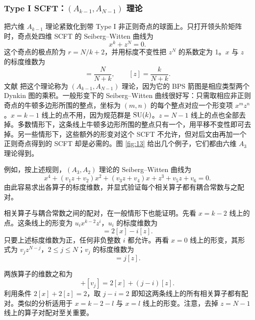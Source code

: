 \subsubsection{Type I SCFT：$(A_{k-1},A_{N-1})$ 理论}
\label{sec:6.1.1}

把六维 $A_{k-1}$ 理论紧致化到带 Type I 非正则奇点的球面上。只打开领头阶矩阵时，奇点处四维 SCFT 的 Seiberg--Witten 曲线为
\begin{equation}
x^k+z^N = 0 .
\label{eq:6.12}\tag{6.12}
\end{equation}
这个奇点的极点阶为 $r=N/k+2$，并用标度不变性把 $z^N$ 的系数定为 1。$x$ 与 $z$ 的标度维数为
\begin{equation}
[x] = \frac{N}{N+k},\qquad [z] = \frac{k}{N+k} .
\label{eq:6.13}\tag{6.13}
\end{equation}
文献 \cite{17} 把这个理论称为 $(A_{k-1},A_{N-1})$ 理论，因为它的 BPS 箭图是相应类型两个 Dynkin 图的乘积。一般形变下的 Seiberg--Witten 曲线很好写：只需取相应非正则奇点的牛顿多边形所围的整点，坐标为 $(m,n)$ 的每个整点对应一个形变项 $x^mz^n$。$x=k-1$ 线上的点不用，因为规范群是 $\operatorname{SU}(k)$。$z=N-1$ 线上的点也全部去掉。多数情形下，这条线上牛顿多边形所围的整点只有一个，用平移不变性即可去掉。另一些情形下，这些额外的形变对这个 SCFT 不允许，但对后文由再加一个正则奇点得到的 SCFT 却是必需的。图 \ref{fig:13} 给出几个例子，它们都由六维 $A_3$ 理论得到。

例如，按上述规则，$(A_3,A_2)$ 理论的 Seiberg--Witten 曲线为
\begin{equation}
x^4+(v_1z+v_2)x^2+(v_3z+v_4)x+z^3+v_5z+v_6 = 0 .
\label{eq:6.14}\tag{6.14}
\end{equation}
由此容易求出各算子的标度维数，并显式验证每个相关算子都有耦合常数与之配对。

相关算子与耦合常数之间的配对，在一般情形下也能证明。先看 $x=k-2$ 线上的点。这条线上的形变为 $u_ix^{k-2}z^i$，$u_i$ 的标度维数为
\begin{equation}
[u_i] = 2[x]-i[z] .
\label{eq:6.15}\tag{6.15}
\end{equation}
只要上述标度维数为正，任何非负整数 $i$ 都允许。再看 $x=0$ 线上的形变，其形式为 $v_jz^{N-j}$，$2\le j\le N$；$v_j$ 的标度维数为
\begin{equation}
[v_j] = j[z] .
\label{eq:6.16}\tag{6.16}
\end{equation}

两族算子的维数之和为
\begin{equation}
[u_i]+[v_j] = 2[x]+(j-i)[z] .
\label{eq:6.17}\tag{6.17}
\end{equation}
利用条件 $2[x]+2[z]=2$，取 $j-i=2$ 即知这两条线上的所有相关算子都有配对。类似的分析适用于 $x=k-2-l$ 与 $x=l$ 线上的形变。注意，去掉 $z=N-1$ 线上的算子对配对至关重要。

